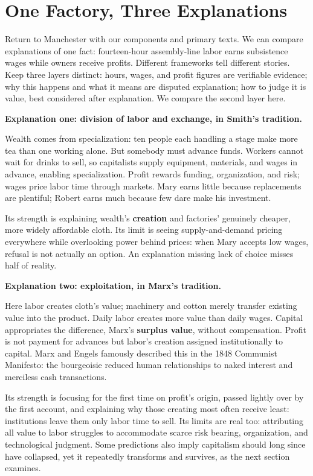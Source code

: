 \section{One Factory, Three Explanations}
Return to Manchester with our components and primary texts. We can compare explanations of one fact: fourteen-hour assembly-line labor earns subsistence wages while owners receive profits. Different frameworks tell different stories. Keep three layers distinct: hours, wages, and profit figures are verifiable evidence; why this happens and what it means are disputed explanation; how to judge it is value, best considered after explanation. We compare the second layer here.

\textbf{Explanation one: division of labor and exchange, in Smith's tradition.}

Wealth comes from specialization: ten people each handling a stage make more tea than one working alone. But somebody must advance funds. Workers cannot wait for drinks to sell, so capitalists supply equipment, materials, and wages in advance, enabling specialization. Profit rewards funding, organization, and risk; wages price labor time through markets. Mary earns little because replacements are plentiful; Robert earns much because few dare make his investment.

Its strength is explaining wealth's \textbf{creation} and factories' genuinely cheaper, more widely affordable cloth. Its limit is seeing supply-and-demand pricing everywhere while overlooking power behind prices: when Mary accepts low wages, refusal is not actually an option. An explanation missing lack of choice misses half of reality.

\textbf{Explanation two: exploitation, in Marx's tradition.}

Here labor creates cloth's value; machinery and cotton merely transfer existing value into the product. Daily labor creates more value than daily wages. Capital appropriates the difference, Marx's \textbf{surplus value}, without compensation. Profit is not payment for advances but labor's creation assigned institutionally to capital. Marx and Engels famously described this in the 1848 Communist Manifesto: the bourgeoisie reduced human relationships to naked interest and merciless cash transactions.

Its strength is focusing for the first time on profit's origin, passed lightly over by the first account, and explaining why those creating most often receive least: institutions leave them only labor time to sell. Its limits are real too: attributing all value to labor struggles to accommodate scarce risk bearing, organization, and technological judgment. Some predictions also imply capitalism should long since have collapsed, yet it repeatedly transforms and survives, as the next section examines.

